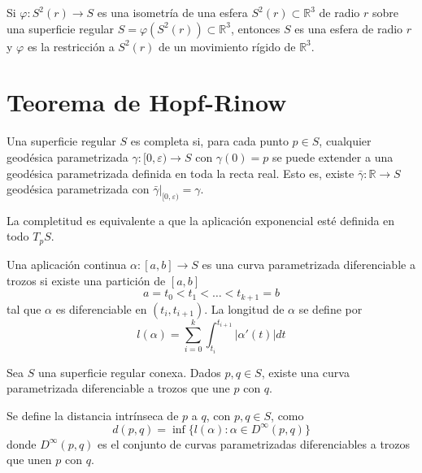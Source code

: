 \begin{theorem}
    Si $\varphi : S^2(r) \to S$ es una isometría de una esfera $S^2(r) \subset \mathbb{R}^3$ de radio $r$ sobre una superficie regular $S = \varphi(S^2(r)) \subset \mathbb{R}^3$, entonces $S$ es una esfera de radio $r$ y $\varphi$ es la restricción a $S^2(r)$ de un movimiento rígido de $\mathbb{R}^3$.
\end{theorem}

\section{Teorema de Hopf-Rinow}

\begin{definition}
    Una superficie regular $S$ es completa si, para cada punto $p \in S$, cualquier geodésica parametrizada $\gamma : [0, \varepsilon) \to S$ con $\gamma(0) = p$ se puede extender a una geodésica parametrizada definida en toda la recta real.
    Esto es, existe $\bar{\gamma} : \mathbb{R} \to S$ geodésica parametrizada con $\bar{\gamma}|_{[0, \varepsilon)} = \gamma$.
\end{definition}

\begin{remark}
    La completitud es equivalente a que la aplicación exponencial esté definida en todo $T_pS$.
\end{remark}

\begin{definition}
    Una aplicación continua $\alpha : [a, b] \to S$ es una curva parametrizada diferenciable a trozos si existe una partición de $[a, b]$
    $$a = t_0 < t_1 < \dots < t_{k+1} = b$$
    tal que $\alpha$ es diferenciable en $(t_i, t_{i+1})$.
    La longitud de $\alpha$ se define por $$l(\alpha) = \sum^k_{i=0} \int^{t_{i+1}}_{t_i} |\alpha'(t)|dt$$
\end{definition}

\begin{proposition}
    Sea $S$ una superficie regular conexa.
    Dados $p, q \in S$, existe una curva parametrizada diferenciable a trozos que une $p$ con $q$.
\end{proposition}

\begin{definition}
    Se define la distancia intrínseca de $p$ a $q$, con $p, q \in S$, como $$d(p, q) = \inf \{ l(\alpha) : \alpha \in D^\infty(p,q) \}$$ donde $D^\infty(p, q)$ es el conjunto de curvas parametrizadas diferenciables a trozos que unen $p$ con $q$.
\end{definition}

